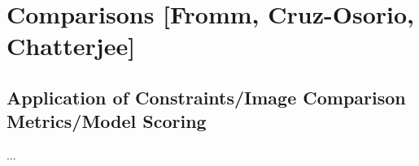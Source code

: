 \documentclass[twocolumn,tighten,dvipsnames,linenumbers]{aastex63}
\newcommand\note[1]{{\color{OliveGreen}[note: #1]}}
\begin{document}

\section{Comparisons
  [Fromm, Cruz-Osorio, Chatterjee]}
\label{sec:comparisons}

\subsection{Application of Constraints/Image Comparison Metrics/Model Scoring}
\label{sec:apply}

...









\end{document}
